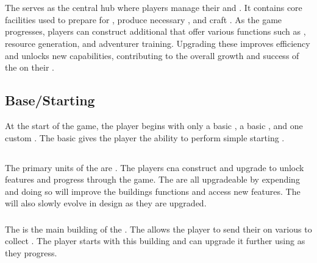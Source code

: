 \chapter{}

The  serves as the central hub where players manage their  and . It contains core facilities used to prepare  for , produce necessary , and craft . As the game progresses, players can construct additional  that offer various functions such as , resource generation, and adventurer training. Upgrading these  improves efficiency and unlocks new capabilities, contributing to the overall growth and success of the  on their .

\section{Base/Starting }

At the start of the game, the player begins with only a basic , a basic , and one custom . The basic  gives the player the ability to perform simple starting .

\section{}

The primary units of the  are . The players cna construct and upgrade  to unlock features and progress through the game. The  are all upgradeable by expending  and doing so will improve the buildings functions and access new features. The  will also slowly evolve in design as they are upgraded.

\subsection{}

The  is the main building of the . The  allows the player to send their  on various  to collect . The player starts with this building and can upgrade it further using  as they progress. 

